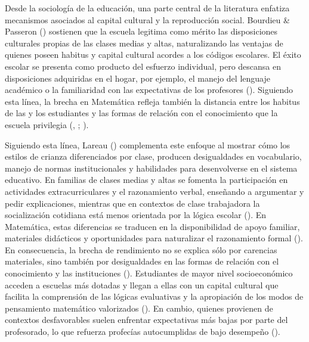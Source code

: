 \documentclass[
  spanish,
  a4paper,
  oneside]{scrbook}
\begin{document}
Desde la sociología de la educación, una parte central de la literatura
enfatiza mecanismos asociados al capital cultural y la reproducción
social. Bourdieu \& Passeron ()
sostienen que la escuela legitima como mérito las disposiciones
culturales propias de las clases medias y altas, naturalizando las
ventajas de quienes poseen habitus y capital cultural acordes a los
códigos escolares. El éxito escolar se presenta como producto del
esfuerzo individual, pero descansa en disposiciones adquiridas en el
hogar, por ejemplo, el manejo del lenguaje académico o la familiaridad
con las expectativas de los profesores
(). Siguiendo esta línea, la
brecha en Matemática refleja también la distancia entre los habitus de
las y los estudiantes y las formas de relación con el conocimiento que
la escuela privilegia (,
;
).

Siguiendo esta línea, Lareau ()
complementa este enfoque al mostrar cómo los estilos de crianza
diferenciados por clase, producen desigualdades en vocabulario, manejo
de normas institucionales y habilidades para desenvolverse en el sistema
educativo. En familias de clases medias y altas se fomenta la
participación en actividades extracurriculares y el razonamiento verbal,
enseñando a argumentar y pedir explicaciones, mientras que en contextos
de clase trabajadora la socialización cotidiana está menos orientada por
la lógica escolar (). En
Matemática, estas diferencias se traducen en la disponibilidad de apoyo
familiar, materiales didácticos y oportunidades para naturalizar el
razonamiento formal (). En consecuencia, la brecha de rendimiento no se explica
sólo por carencias materiales, sino también por desigualdades en las
formas de relación con el conocimiento y las instituciones
(). Estudiantes de mayor nivel
socioeconómico acceden a escuelas más dotadas y llegan a ellas con un
capital cultural que facilita la comprensión de las lógicas evaluativas
y la apropiación de los modos de pensamiento matemático valorizados
(). En
cambio, quienes provienen de contextos desfavorables suelen enfrentar
expectativas más bajas por parte del profesorado, lo que refuerza
profecías autocumplidas de bajo desempeño
().
\end{document}
